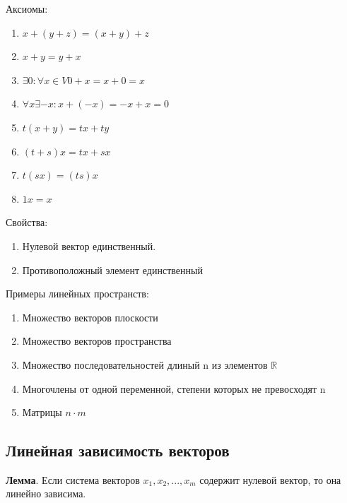 \documentclass[a4paper]{article}
\begin{document}
    Аксиомы:
    \begin{enumerate}
        \item $x+(y+z) = (x+y)+z$
        \item $x+y=y+x$
        \item $\exists 0: \forall x \in V 0 + x = x + 0 = x$
        \item $\forall x \exists -x: x + (-x) = -x + x = 0$
        \item $t(x+y) = tx + ty$
        \item $(t+s)x = tx + sx$
        \item $t(sx) = (ts)x$
        \item $1x = x$
    \end{enumerate}


    Свойства:
    \begin{enumerate}
        \item Нулевой вектор единственный.
        \item Противоположный элемент единственный
    \end{enumerate}

    Примеры линейных пространств:
    \begin{enumerate}
        \item Множество векторов плоскости
        \item Множество векторов пространства
        \item Множество последовательностей длиный n из элементов $\mathbb{R}$
        \item Многочлены от одной переменной, степени которых не превосходят n
        \item Матрицы $n \cdot m$
    \end{enumerate}

    \newpage \begin{center}
                 \begin{Large}
                 \end{Large}
    \end{center}
    \subsection*{Линейная зависимость векторов}
    \begin{htheorem}
        \textbf{Лемма}. Если система векторов $x_1, x_2, ..., x_m$ содержит нулевой вектор, то она линейно зависима.
    \end{htheorem}
\end{document}
